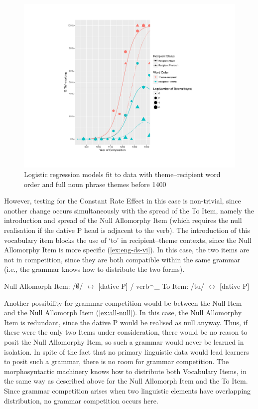 	\begin{figure}[ht!]
		\includegraphics[width=\linewidth]{../images/to-use-bf-1400}
		\caption{Logistic regression models fit to data with theme--recipient word order and full noun phrase themes before 1400}
		\label{fig:to-use-bf-1400}
	\end{figure}

	However, testing for the Constant Rate Effect in this case is non-trivial, since another change occurs simultaneously with the spread of the To Item, namely the introduction and spread of the Null Allomorphy Item (which requires the null realisation if the dative P head is adjacent to the verb). The introduction of this vocabulary item blocks the use of `to' in recipient--theme contexts, since the Null Allomorphy Item is more specific (\ref{ex:eng-ds-vi}). In this case, the two items are not in competition, since they are both compatible within the same grammar (i.e., the grammar knows how to distribute the two forms).

	\begin{exe}
		\begin{xlist}
			\ex Null Allomorph Item: /$\emptyset$/ $\leftrightarrow$ [dative P] / verb$^{\smallfrown}$\_
			\ex To Item: /tu/ $\leftrightarrow$ [dative P]
		\end{xlist}
	\end{exe}

	Another possibility for grammar competition would be between the Null Item and the Null Allomorph Item (\ref{ex:all-null}). In this case, the Null Allomorphy Item is redundant, since the dative P would be realised as null anyway. Thus, if these were the only two Items under consideration, there would be no reason to posit the Null Allomorphy Item, so such a grammar would never be learned in isolation. In spite of the fact that no primary linguistic data would lead learners to posit such a grammar, there is no room for grammar competition. The morphosyntactic machinery knows how to distribute both Vocabulary Items, in the same way as described above for the Null Allomorph Item and the To Item. Since grammar competition arises when two linguistic elements have overlapping distribution, no grammar competition occurs here. 

